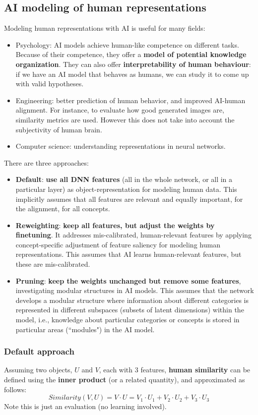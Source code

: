 \subsection{AI modeling of human representations}
Modeling human representations with AI is useful for many fields:
\begin{itemize}
    \item Psychology: AI models achieve human-like competence on different tasks. Because of their competence, they offer a \textbf{model of potential knowledge organization}. They can also offer \textbf{interpretability of human behaviour}: if we have an AI model that behaves as humans, we can study it to come up with valid hypotheses.
    \item Engineering: better prediction of human behavior, and improved AI-human alignment. For instance, to evaluate how good generated images are, similarity metrics are used. However this does not take into account the subjectivity of human brain.
    \item Computer science: understanding representations in neural networks.
\end{itemize}

There are three approaches:
\begin{itemize}
    \item \textbf{Default}: \textbf{use all DNN features} (all in the whole network, or all in a particular layer) as object-representation for modeling human data. This implicitly assumes that all features are relevant and equally important, for the alignment, for all concepts.
    \item \textbf{Reweighting}: \textbf{keep all features, but adjust the weights by finetuning}. It addresses mis-calibrated, human-relevant features by applying concept-specific adjustment of feature saliency for modeling human representations. This assumes that AI learns human-relevant features, but these are mis-calibrated.
    \item \textbf{Pruning}: \textbf{keep the weights unchanged but remove some features}, investigating modular structures in AI models. This assumes that the network develops a modular structure where information about different categories is represented in different subspaces (subsets of latent dimensions) within the model, i.e., knowledge about particular categories or concepts is stored in particular areas (``modules") in the AI model.
\end{itemize}

\subsubsection{Default approach}
Assuming two objects, $U$ and $V$, each with 3 features, \textbf{human similarity} can be defined using the \textbf{inner product} (or a related quantity), and approximated as follows:
\[
    Similarity(V,U) = V \cdot U = V_1 \cdot U_1 +  V_2 \cdot U_2 + V_3 \cdot U_3
\]
Note this is just an evaluation (no learning involved).

